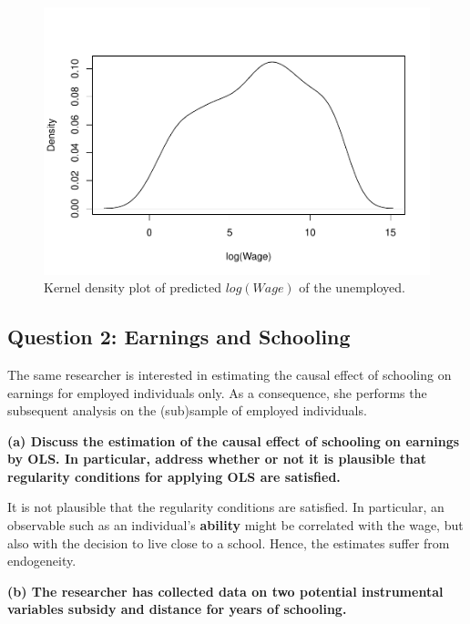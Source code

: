 \documentclass[
]{article}
\begin{document}
\begin{figure}

{\centering \includegraphics{assignment_1_files/figure-latex/fig_density_log_wage-1} 

}

\caption{\label{fig:figs}Kernel density plot of predicted $log(Wage)$ of the unemployed.}\label{fig:fig_density_log_wage}
\end{figure}

\clearpage

\hypertarget{question-2-earnings-and-schooling}{%
\subsection{Question 2: Earnings and
Schooling}\label{question-2-earnings-and-schooling}}

The same researcher is interested in estimating the causal effect of
schooling on earnings for employed individuals only. As a consequence,
she performs the subsequent analysis on the (sub)sample of employed
individuals.

\textbf{(a) Discuss the estimation of the causal effect of schooling on
earnings by OLS. In particular, address whether or not it is plausible
that regularity conditions for applying OLS are satisfied.}

It is not plausible that the regularity conditions are satisfied. In
particular, an observable such as an individual's \textbf{ability} might
be correlated with the wage, but also with the decision to live close to
a school. Hence, the estimates suffer from endogeneity.

\textbf{(b) The researcher has collected data on two potential
instrumental variables subsidy and distance for years of schooling.}
\end{document}
